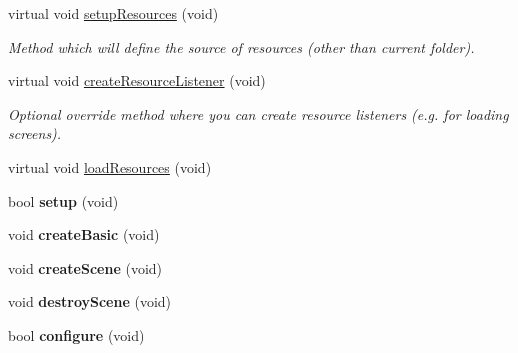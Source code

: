 \begin{DoxyCompactItemize}
\item 
\hypertarget{class_p_f_b_application_a6e2c13a0e37a09dd1261aeb5e9949048}{
virtual void \hyperlink{class_p_f_b_application_a6e2c13a0e37a09dd1261aeb5e9949048}{setupResources} (void)}
\label{class_p_f_b_application_a6e2c13a0e37a09dd1261aeb5e9949048}

\begin{DoxyCompactList}\small\item\em Method which will define the source of resources (other than current folder). \item\end{DoxyCompactList}\item 
\hypertarget{class_p_f_b_application_a1e507b905ca94494d24a6a67327f6950}{
virtual void \hyperlink{class_p_f_b_application_a1e507b905ca94494d24a6a67327f6950}{createResourceListener} (void)}
\label{class_p_f_b_application_a1e507b905ca94494d24a6a67327f6950}

\begin{DoxyCompactList}\small\item\em Optional override method where you can create resource listeners (e.g. for loading screens). \item\end{DoxyCompactList}\item 
virtual void \hyperlink{class_p_f_b_application_ac6f6f7f78b143d33e438be923fc9eac9}{loadResources} (void)
\item 
\hypertarget{class_p_f_b_application_a053e873c9cbd34c872a21f2dd3874960}{
bool {\bfseries setup} (void)}
\label{class_p_f_b_application_a053e873c9cbd34c872a21f2dd3874960}

\item 
\hypertarget{class_p_f_b_application_af0e69d37727bd2398c5072b191e62b83}{
void {\bfseries createBasic} (void)}
\label{class_p_f_b_application_af0e69d37727bd2398c5072b191e62b83}

\item 
\hypertarget{class_p_f_b_application_a778b0d028ce1d441baf73b4780906334}{
void {\bfseries createScene} (void)}
\label{class_p_f_b_application_a778b0d028ce1d441baf73b4780906334}

\item 
\hypertarget{class_p_f_b_application_a53efe4d4ae1275655c2f8f272ae6c045}{
void {\bfseries destroyScene} (void)}
\label{class_p_f_b_application_a53efe4d4ae1275655c2f8f272ae6c045}

\item 
\hypertarget{class_p_f_b_application_abaa6d75889344b35d18d7445262d5bcd}{
bool {\bfseries configure} (void)}
\label{class_p_f_b_application_abaa6d75889344b35d18d7445262d5bcd}

\end{DoxyCompactItemize}
